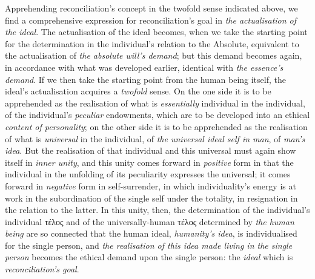 \documentclass[12pt,a4paper]{book}
\begin{document}
Apprehending reconciliation's concept in the twofold sense indicated above, we
find a comprehensive expression for reconciliation's goal in \emph{the
actualisation of the ideal}. The actualisation of the ideal becomes, when we
take the starting point for the determination in the individual's relation to
the Absolute, equivalent to the actualisation of \emph{the absolute will's
demand}; but this demand becomes again, in accordance with what was developed
earlier, identical with \emph{the essence's demand}. If we then take the
starting point from the human being itself, the ideal's actualisation acquires
a \emph{twofold} sense. On the one side it is to be apprehended as the
realisation of what is \emph{essentially} individual in the individual, of the
individual's \emph{peculiar} endowments, which are to be developed into an
ethical \emph{content of personality}; on the other side it is
to be apprehended as the realisation of what is \emph{universal} in the
individual, of \emph{the universal ideal self in man}, of \emph{man's idea}. But
the realisation of that individual and this universal must again show itself in
\emph{inner unity}, and this unity comes forward in \emph{positive} form in that
the individual in the unfolding of its peculiarity expresses the universal; it
comes forward in \emph{negative} form in self-surrender, in which
individuality's energy is at work in the subordination of the single self under
the totality, in resignation in the relation to the latter. In this unity, then,
the determination of the individual's individual τέλος and of the
universally-human τέλος determined by \emph{the human being} are so connected
that the human ideal, \emph{humanity's idea}, is individualised for the single
person, and \emph{the realisation of this idea made living in the single person}
becomes the ethical demand upon the single person: the \emph{ideal} which is
\emph{reconciliation's goal}.
\end{document}
